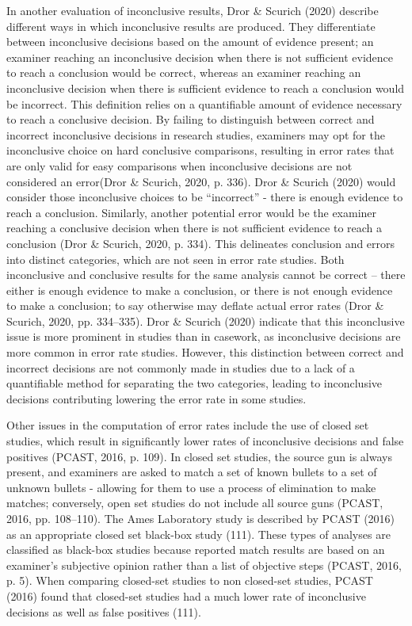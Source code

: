 \documentclass[print]{nuthesis}
\begin{document}
In another evaluation of inconclusive results, Dror \& Scurich (2020) describe different ways in which inconclusive results are produced.
They differentiate between inconclusive decisions based on the amount of evidence present; an examiner reaching an inconclusive decision when there is not sufficient evidence to reach a conclusion would be correct, whereas an examiner reaching an inconclusive decision when there is sufficient evidence to reach a conclusion would be incorrect.
This definition relies on a quantifiable amount of evidence necessary to reach a conclusive decision.
By failing to distinguish between correct and incorrect inconclusive decisions in research studies, examiners may opt for the inconclusive choice on hard conclusive comparisons, resulting in error rates that are only valid for easy comparisons when inconclusive decisions are not considered an error(Dror \& Scurich, 2020, p. 336).
Dror \& Scurich (2020) would consider those inconclusive choices to be ``incorrect'' - there is enough evidence to reach a conclusion.
Similarly, another potential error would be the examiner reaching a conclusive decision when there is not sufficient evidence to reach a conclusion (Dror \& Scurich, 2020, p. 334).
This delineates conclusion and errors into distinct categories, which are not seen in error rate studies.
Both inconclusive and conclusive results for the same analysis cannot be correct -- there either is enough evidence to make a conclusion, or there is not enough evidence to make a conclusion; to say otherwise may deflate actual error rates (Dror \& Scurich, 2020, pp. 334--335).
Dror \& Scurich (2020) indicate that this inconclusive issue is more prominent in studies than in casework, as inconclusive decisions are more common in error rate studies.
However, this distinction between correct and incorrect decisions are not commonly made in studies due to a lack of a quantifiable method for separating the two categories, leading to inconclusive decisions contributing lowering the error rate in some studies.

Other issues in the computation of error rates include the use of closed set studies, which result in significantly lower rates of inconclusive decisions and false positives (PCAST, 2016, p. 109). In closed set studies, the source gun is always present, and examiners are asked to match a set of known bullets to a set of unknown bullets - allowing for them to use a process of elimination to make matches; conversely, open set studies do not include all source guns (PCAST, 2016, pp. 108--110).
The Ames Laboratory study is described by PCAST (2016) as an appropriate closed set black-box study (111).
These types of analyses are classified as black-box studies because reported match results are based on an examiner's subjective opinion rather than a list of objective steps (PCAST, 2016, p. 5).
When comparing closed-set studies to non closed-set studies, PCAST (2016) found that closed-set studies had a much lower rate of inconclusive decisions as well as false positives (111).
\end{document}
